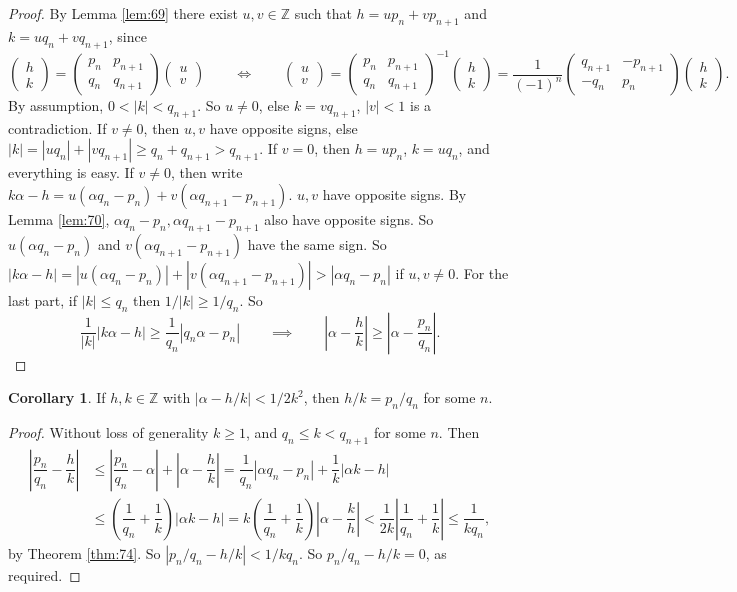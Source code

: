 \documentclass{article}
\newcommand{\Z}{\mathbb{Z}}
\newcommand{\rb}[1]{\left( #1 \right)}
\newcommand{\abs}[1]{\left\lvert #1 \right\rvert}
\newcommand{\two}[2]{\begin{pmatrix} #1 \\ #2 \end{pmatrix}}
\theoremstyle{definition}\newtheorem{definition}{Definition}
\theoremstyle{definition}\newtheorem{remark}[definition]{Remark}
\theoremstyle{definition}\newtheorem*{example}{Example}
\theoremstyle{definition}\newtheorem*{note}{Note}
\newtheorem{corollary}[definition]{Corollary}
\begin{document}
\begin{proof}
By Lemma \ref{lem:69} there exist $ u, v \in \Z $ such that $ h = up_n + vp_{n + 1} $ and $ k = uq_n + vq_{n + 1} $, since
$$ \two{h}{k} = \two{p_n & p_{n + 1}}{q_n & q_{n + 1}}\two{u}{v} \qquad \iff \qquad \two{u}{v} = \two{p_n & p_{n + 1}}{q_n & q_{n + 1}}^{-1}\two{h}{k} = \dfrac{1}{\rb{-1}^n}\two{q_{n + 1} & -p_{n + 1}}{-q_n & p_n}\two{h}{k}. $$
By assumption, $ 0 < \abs{k} < q_{n + 1} $. So $ u \ne 0 $, else $ k = vq_{n + 1} $, $ \abs{v} < 1 $ is a contradiction. If $ v \ne 0 $, then $ u, v $ have opposite signs, else $ \abs{k} = \abs{uq_n} + \abs{vq_{n + 1}} \ge q_n + q_{n + 1} > q_{n + 1} $. If $ v = 0 $, then $ h = up_n $, $ k = uq_n $, and everything is easy. If $ v \ne 0 $, then write $ k\alpha - h = u\rb{\alpha q_n - p_n} + v\rb{\alpha q_{n + 1} - p_{n + 1}} $. $ u, v $ have opposite signs. By Lemma \ref{lem:70}, $ \alpha q_n - p_n, \alpha q_{n + 1} - p_{n + 1} $ also have opposite signs. So $ u\rb{\alpha q_n - p_n} $ and $ v\rb{\alpha q_{n + 1} - p_{n + 1}} $ have the same sign. So $ \abs{k\alpha - h} = \abs{u\rb{\alpha q_n - p_n}} + \abs{v\rb{\alpha q_{n + 1} - p_{n + 1}}} > \abs{\alpha q_n - p_n} $ if $ u, v \ne 0 $. For the last part, if $ \abs{k} \le q_n $ then $ 1 / \abs{k} \ge 1 / q_n $. So
$$ \dfrac{1}{\abs{k}}\abs{k\alpha - h} \ge \dfrac{1}{q_n}\abs{q_n\alpha - p_n} \qquad \implies \qquad \abs{\alpha - \dfrac{h}{k}} \ge \abs{\alpha - \dfrac{p_n}{q_n}}. $$
\end{proof}

\begin{corollary}
\label{cor:75}
If $ h, k \in \Z $ with $ \abs{\alpha - h / k} < 1 / 2k^2 $, then $ h / k = p_n / q_n $ for some $ n $.
\end{corollary}

\begin{proof}
Without loss of generality $ k \ge 1 $, and $ q_n \le k < q_{n + 1} $ for some $ n $. Then
\begin{align*}
\abs{\dfrac{p_n}{q_n} - \dfrac{h}{k}}
& \le \abs{\dfrac{p_n}{q_n} - \alpha} + \abs{\alpha - \dfrac{h}{k}}
= \dfrac{1}{q_n}\abs{\alpha q_n - p_n} + \dfrac{1}{k}\abs{\alpha k - h} \\
& \le \rb{\dfrac{1}{q_n} + \dfrac{1}{k}}\abs{\alpha k - h}
= k\rb{\dfrac{1}{q_n} + \dfrac{1}{k}}\abs{\alpha - \dfrac{k}{h}}
< \dfrac{1}{2k}\abs{\dfrac{1}{q_n} + \dfrac{1}{k}}
\le \dfrac{1}{kq_n},
\end{align*}
by Theorem \ref{thm:74}. So $ \abs{p_n / q_n - h / k} < 1 / kq_n $. So $ p_n / q_n - h / k = 0 $, as required.
\end{proof}
\end{document}

